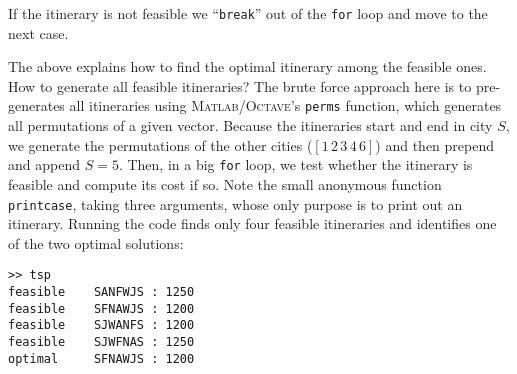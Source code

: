 \documentclass[11pt]{amsart}
\newcommand{\mfile}[2]{
\begin{quote}
\VerbatimInput[frame=single,framesep=3mm,label=\fbox{\normalsize \textsl{\,#2\,}},fontfamily=courier,fontsize=\scriptsize]{#1}
\end{quote}
}
\newcommand{\Matlab}{\textsc{Matlab}\xspace}
\newcommand{\Octave}{\textsc{Octave}\xspace}
\begin{document}
\medskip
\noindent If the itinerary is not feasible we ``\texttt{break}'' out of the \texttt{for} loop and move to the next case.

The above explains how to find the optimal itinerary among the feasible ones.  How to generate all feasible itineraries?  The brute force approach here is to pre-generates all itineraries using \Matlab/\Octave's \texttt{perms} function, which generates all permutations of a given vector.  Because the itineraries start and end in city $S$, we generate the permutations of the other cities ($[1\,2\,3\,4\,6]$) and then prepend and append $S=5$.  Then, in a big \texttt{for} loop, we test whether the itinerary is feasible and compute its cost if so.  Note the small anonymous function \texttt{printcase}, taking three arguments, whose only purpose is to print out an itinerary.  Running the code finds only four feasible itineraries and identifies one of the two optimal solutions:

\medskip
\begin{Verbatim}[fontfamily=courier,fontsize=\scriptsize]
>> tsp
feasible    SANFWJS : 1250
feasible    SFNAWJS : 1200
feasible    SJWANFS : 1200
feasible    SJWFNAS : 1250
optimal     SFNAWJS : 1200
\end{Verbatim}
\bigskip

\mfile{matlab/tsp.m}{tsp.m}
\end{document}
